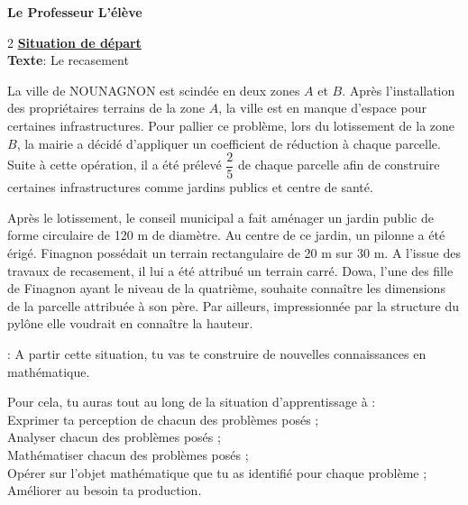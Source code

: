  
  \vspace{1cm}
  \begin{center}
  	\textbf{Le Professeur} \hspace{11cm}    \textbf{L'élève}
  \end{center}
  \newpage
  \begin{multicols*}{2}
  	\underline{\textbf{Situation de départ}} \\
  	\textbf{Texte}: Le recasement 
  	
  	
  	\hspace{0.5cm} La ville de NOUNAGNON est scindée en deux zones $A$ et $B$. Après l'installation des propriétaires terrains de la zone $A$, la ville est en manque d'espace pour certaines infrastructures. Pour pallier ce problème, lors du lotissement de la zone $B$, la mairie a décidé d'appliquer un coefficient de réduction à chaque parcelle. Suite à cette opération, il a été prélevé $\dfrac{2}{5}$ de chaque parcelle afin de construire certaines infrastructures comme jardins publics et centre de santé.
  	
  	Après le lotissement, le conseil municipal a fait aménager un jardin public de forme circulaire de 120 m de diamètre. Au centre de ce jardin, un pilonne a été érigé. 
  	Finagnon possédait un terrain rectangulaire de 20 m sur 30 m. A l'issue des travaux de recasement, il lui a été attribué un terrain carré. Dowa, l'une des fille de Finagnon ayant le niveau de la quatrième, souhaite connaître les dimensions de la parcelle attribuée à son père. Par ailleurs, impressionnée par la structure du pylône elle voudrait en connaître la hauteur.  
  	
  	
  	 : A partir cette situation, tu vas te construire de nouvelles connaissances en mathématique.
  	
  	Pour cela, tu auras tout au long de la situation d’apprentissage à :\\ 
  	 Exprimer ta perception de chacun des problèmes posés ;\\ 
  	 Analyser chacun des problèmes posés ; \\
  	 Mathématiser chacun des problèmes posés ; \\
  	 Opérer sur l’objet mathématique que tu as identifié pour chaque problème ; \\
  	 Améliorer au besoin ta production.
  	\begin{center}

\end{center}
\end{multicols*}
